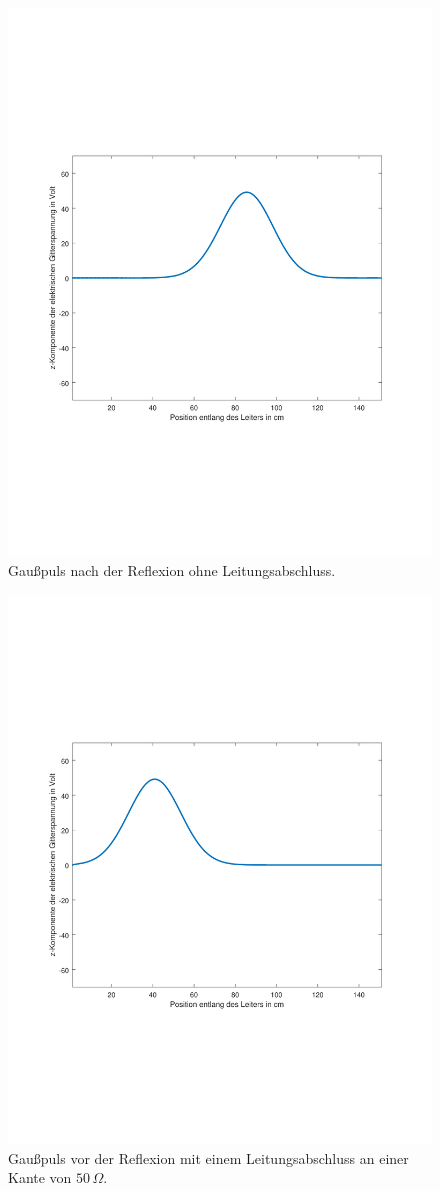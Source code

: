 \documentclass[Protokollheft.tex]{subfiles}
\begin{document}
\begin{figure}[ht]
	\centering
	\includegraphics[trim = 20mm 65mm 20mm 65mm, clip,width=0.7\linewidth]{untitled2.pdf}
	\caption{Gaußpuls nach der Reflexion ohne Leitungsabschluss.}\label{fig:gauss2}
\end{figure}
\begin{figure}[ht]
	\centering
	\includegraphics[trim = 20mm 65mm 20mm 65mm, clip,width=0.7\linewidth]{untitled3.pdf}
	\caption{Gaußpuls vor der Reflexion mit einem Leitungsabschluss an einer Kante von $50\,\Omega$.}\label{fig:gauss3}
\end{figure}
\end{document}
